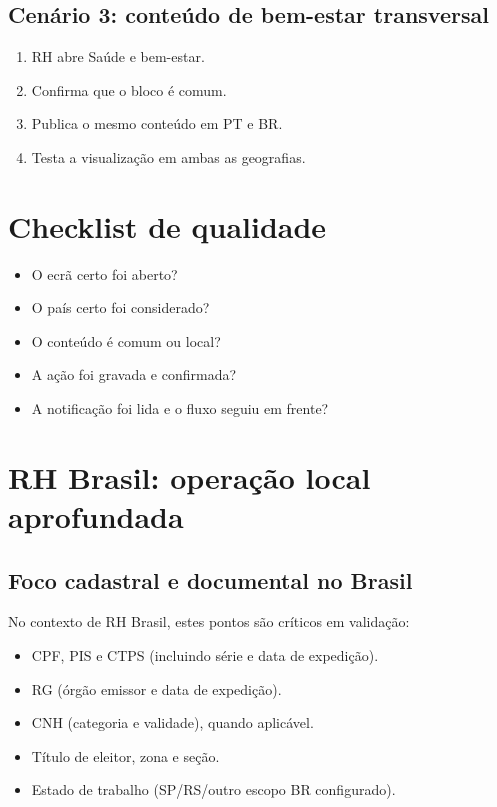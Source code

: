 \section{Cenário 3: conteúdo de bem-estar transversal}
\begin{enumerate}
  \item RH abre Saúde e bem-estar.
  \item Confirma que o bloco é comum.
  \item Publica o mesmo conteúdo em PT e BR.
  \item Testa a visualização em ambas as geografias.
\end{enumerate}

\chapter{Checklist de qualidade}
\begin{itemize}
  \item O ecrã certo foi aberto?
  \item O país certo foi considerado?
  \item O conteúdo é comum ou local?
  \item A ação foi gravada e confirmada?
  \item A notificação foi lida e o fluxo seguiu em frente?
\end{itemize}

\chapter{RH Brasil: operação local aprofundada}
\section{Foco cadastral e documental no Brasil}
No contexto de RH Brasil, estes pontos são críticos em validação:
\begin{itemize}
  \item CPF, PIS e CTPS (incluindo série e data de expedição).
  \item RG (órgão emissor e data de expedição).
  \item CNH (categoria e validade), quando aplicável.
  \item Título de eleitor, zona e seção.
  \item Estado de trabalho (SP/RS/outro escopo BR configurado).
\end{itemize}

